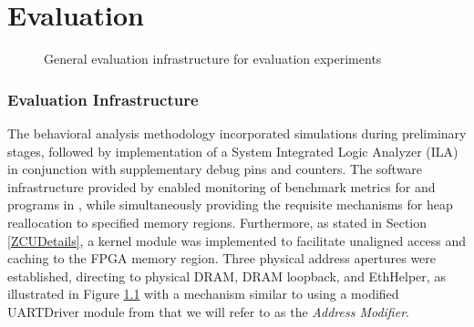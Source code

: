 \chapter{Evaluation}
\label{chapter:Eval}




\begin{figure}
    \centering
    
    \caption{General evaluation infrastructure for evaluation experiments}
    \label{fig:Memory_Layout}
\end{figure}

\subsection{Evaluation Infrastructure}

The behavioral analysis methodology incorporated simulations during preliminary stages, followed by implementation of a System Integrated Logic Analyzer (ILA) in conjunction with supplementary debug pins and counters. The software infrastructure provided by \cite{RT-Bench} enabled monitoring of benchmark metrics for \cite{SD-VBS} and programs in \cite{Isolbench}, while simultaneously providing the requisite mechanisms for heap reallocation to specified memory regions. Furthermore, as stated in Section \ref{ZCUDetails}, a kernel module was implemented to facilitate unaligned access and caching to the FPGA memory region. Three physical address apertures were established, directing to physical DRAM, DRAM loopback, and EthHelper, as illustrated in Figure \ref{fig:Memory_Layout} with a mechanism similar to \cite{RoozkhoshPLIM} using a modified UARTDriver module from \cite{ciraolo2025} that we will refer to as the \emph{Address Modifier}.

